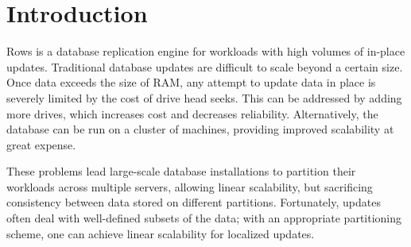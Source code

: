 \documentclass{sig-alternate-sigmod08}
\newcommand{\rows}{Rows\xspace}
\newcommand{\rowss}{Rows'\xspace}
\begin{document}
\begin{abstract}
\rowss throughput is limited by sequential I/O bandwidth.  We use
column compression to reduce this bottleneck.  Rather than reassemble
rows from a column-oriented disk layout, we adapt existing column
compression algorithms to a new row-oriented data layout.  This
introduces negligible space overhead and can be applied to most
single-pass, randomly accessible compression formats.  Our prototype
uses lightweight (superscalar) column compression algorithms.

Existing analytical models and our experiments show that, for disk
bound workloads, \rows provides significantly higher replication
throughput than conventional replication techniques.  Finally, we
introduce an easily measured metric that predicts replication
performance of \rows implementations in a variety of deployment
scenarios.

\end{abstract}





\section{Introduction}

\rows is a database replication engine for workloads with high volumes
of in-place updates.  Traditional database updates are difficult to
scale beyond a certain size.  Once data exceeds the size of RAM, any
attempt to update data in place is severely limited by the cost of
drive head seeks.  This can be addressed by adding more drives, which
increases cost and decreases reliability.  Alternatively, the database
can be run on a cluster of machines, providing improved scalability at
great expense.

These problems lead large-scale database installations to partition
their workloads across multiple servers, allowing linear scalability,
but sacrificing consistency between data stored on different
partitions.  Fortunately, updates often deal with well-defined subsets
of the data; with an appropriate partitioning scheme, one can achieve
linear scalability for localized updates.
\end{document}
